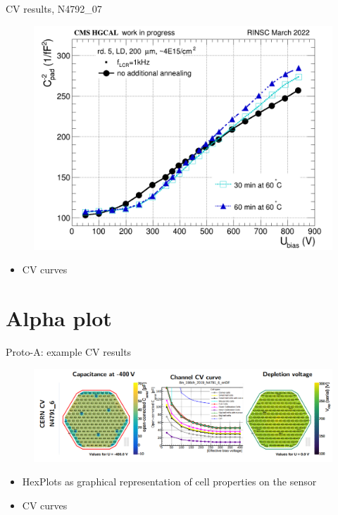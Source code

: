 \documentclass{beamer}
\begin{document}
\begin{frame}{CV results, N4792\_07}
  \begin{figure}
      \includegraphics[width=.7\textwidth]{plots/annealing_CV_ch101_N4792_7.png}    
  \end{figure}
  \begin{itemize}
    \item CV curves
  \end{itemize}
\end{frame}





\section{Alpha plot}

\begin{frame}{Proto-A: example CV results}
  \begin{figure}
      \includegraphics[width=1.0\textwidth]{plots/CV_example.png}    
  \end{figure}
  \begin{itemize}
    \item HexPlots as graphical representation of cell properties on the sensor
    \item CV curves
  \end{itemize}
\end{frame}
\end{document}
